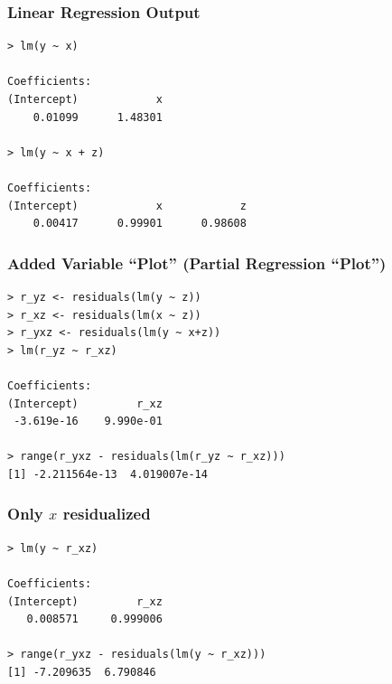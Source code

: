 \documentclass{beamer}
\begin{document}
\begin{frame}[fragile]
\frametitle{Linear Regression Output}

\begin{verbatim}
> lm(y ~ x)

Coefficients:
(Intercept)            x  
    0.01099      1.48301  

> lm(y ~ x + z)

Coefficients:
(Intercept)            x            z  
    0.00417      0.99901      0.98608 
\end{verbatim}

\end{frame}

\begin{frame}[fragile]
\frametitle{Added Variable ``Plot'' (Partial Regression ``Plot'')}

\begin{verbatim}
> r_yz <- residuals(lm(y ~ z))
> r_xz <- residuals(lm(x ~ z))
> r_yxz <- residuals(lm(y ~ x+z))
> lm(r_yz ~ r_xz)

Coefficients:
(Intercept)         r_xz  
 -3.619e-16    9.990e-01  

> range(r_yxz - residuals(lm(r_yz ~ r_xz)))
[1] -2.211564e-13  4.019007e-14
\end{verbatim}

\end{frame}


\begin{frame}[fragile]
\frametitle{Only $x$ residualized}

\begin{verbatim}
> lm(y ~ r_xz)

Coefficients:
(Intercept)         r_xz  
   0.008571     0.999006  

> range(r_yxz - residuals(lm(y ~ r_xz)))
[1] -7.209635  6.790846
\end{verbatim}

\end{frame}


\end{document}

